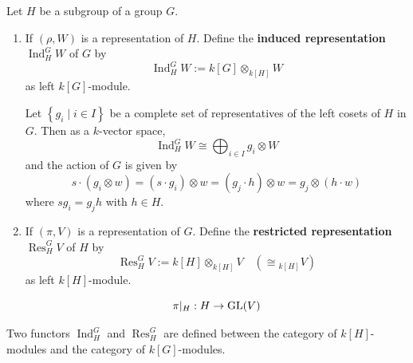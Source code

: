 \documentclass[12pt, oneside]{book}
\begin{document}
\section{ }
\begin{definition}
    Let $H$ be a subgroup of a group $G$.
    \begin{enumerate}
        \item
              If $\left(\rho,W\right)$ is a representation of $H$. Define the \textbf{induced representation} $\operatorname{Ind}_H^G W$ of $G$ by
              \begin{equation*}
                  \operatorname{Ind}_H^G W
                  :=
                  k[G] \otimes_{k[H]} W
              \end{equation*}
              as left $k[G]$-module.
              \begin{remark}
                  Let $\left\{g_i \mid i \in I\right\}$ be a complete set of representatives of the left cosets of $H$ in $G$.
                  Then as a $k$-vector space,
                  \begin{equation*}
                      \operatorname{Ind}_H^G W
                      \cong
                      \bigoplus_{i \in I} g_i \otimes W
                  \end{equation*}
                  and the action of $G$ is given by
                  \begin{equation*}
                      s \cdot\left(g_i \otimes w\right)
                      =\left(s \cdot g_i\right) \otimes w
                      =\left( g_j\cdot h\right) \otimes w
                      =
                      g_j \otimes \left(h \cdot w\right)
                  \end{equation*}
                  where $s g_i=g_j h$ with $h \in H$.
              \end{remark}
        \item
              If $\left(\pi,V\right)$ is a representation of $G$. Define the \textbf{restricted representation} $\operatorname{Res}_H^G V$ of $H$ by
              \begin{equation*}
                  \operatorname{Res}_H^G V
                  :=
                  k[H] \otimes_{k[H]} V \quad
                  \left(\cong {}_{k[H]} V\right)
              \end{equation*}
              as left $k[H]$-module.
              \begin{remark}
                  \begin{equation*}
                      \pi|_H:H\rightarrow \operatorname{\operatorname{GL}}(V)
                  \end{equation*}
              \end{remark}
    \end{enumerate}
    \begin{remark}
        Two functors $\operatorname{Ind}_H^G$ and $\operatorname{Res}_H^G$ are defined between the category of $k[H]$-modules and the category of $k[G]$-modules.
    \end{remark}
\end{definition}
\end{document}
